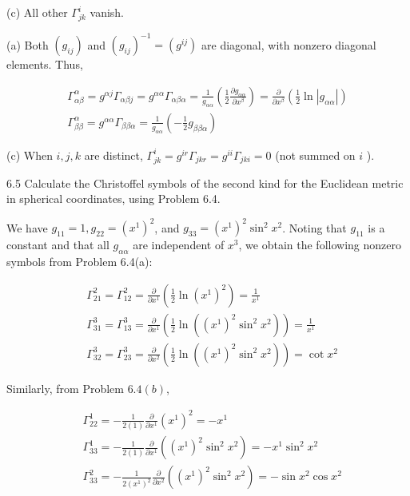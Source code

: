 \documentclass[10pt]{article}
\begin{document}
(c) All other $\Gamma_{j k}^{i}$ vanish.

(a) Both $\left(g_{i j}\right)$ and $\left(g_{i j}\right)^{-1}=\left(g^{i j}\right)$ are diagonal, with nonzero diagonal elements. Thus,


\begin{gather*}
\Gamma_{\alpha \beta}^{\alpha}=g^{\alpha j} \Gamma_{\alpha \beta j}=g^{\alpha \alpha} \Gamma_{\alpha \beta \alpha}=\frac{1}{g_{\alpha \alpha}}\left(\frac{1}{2} \frac{\partial g_{\alpha \alpha}}{\partial x^{\beta}}\right)=\frac{\partial}{\partial x^{\beta}}\left(\frac{1}{2} \ln \left|g_{\alpha \alpha}\right|\right) \\
\Gamma_{\beta \beta}^{\alpha}=g^{\alpha \alpha} \Gamma_{\beta \beta \alpha}=\frac{1}{g_{\alpha \alpha}}\left(-\frac{1}{2} g_{\beta \beta \alpha}\right) \tag{b}
\end{gather*}


(c) When $i, j, k$ are distinct, $\Gamma_{j k}^{i}=g^{i r} \Gamma_{j k r}=g^{i i} \Gamma_{j k i}=0$ (not summed on $i$ ).

6.5 Calculate the Christoffel symbols of the second kind for the Euclidean metric in spherical coordinates, using Problem 6.4.

We have $g_{11}=1, g_{22}=\left(x^{1}\right)^{2}$, and $g_{33}=\left(x^{1}\right)^{2} \sin ^{2} x^{2}$. Noting that $g_{11}$ is a constant and that all $g_{\alpha \alpha}$ are independent of $x^{3}$, we obtain the following nonzero symbols from Problem 6.4(a):

$$
\begin{aligned}
& \Gamma_{21}^{2}=\Gamma_{12}^{2}=\frac{\partial}{\partial x^{1}}\left(\frac{1}{2} \ln \left(x^{1}\right)^{2}\right)=\frac{1}{x^{1}} \\
& \Gamma_{31}^{3}=\Gamma_{13}^{3}=\frac{\partial}{\partial x^{1}}\left(\frac{1}{2} \ln \left(\left(x^{1}\right)^{2} \sin ^{2} x^{2}\right)\right)=\frac{1}{x^{1}} \\
& \Gamma_{32}^{3}=\Gamma_{23}^{3}=\frac{\partial}{\partial x^{2}}\left(\frac{1}{2} \ln \left(\left(x^{1}\right)^{2} \sin ^{2} x^{2}\right)\right)=\cot x^{2}
\end{aligned}
$$

Similarly, from Problem $6.4(b)$,

$$
\begin{aligned}
& \Gamma_{22}^{1}=-\frac{1}{2(1)} \frac{\partial}{\partial x^{1}}\left(x^{1}\right)^{2}=-x^{1} \\
& \Gamma_{33}^{1}=-\frac{1}{2(1)} \frac{\partial}{\partial x^{1}}\left(\left(x^{1}\right)^{2} \sin ^{2} x^{2}\right)=-x^{1} \sin ^{2} x^{2} \\
& \Gamma_{33}^{2}=-\frac{1}{2\left(x^{1}\right)^{2}} \frac{\partial}{\partial x^{2}}\left(\left(x^{1}\right)^{2} \sin ^{2} x^{2}\right)=-\sin x^{2} \cos x^{2}
\end{aligned}
$$
\end{document}
